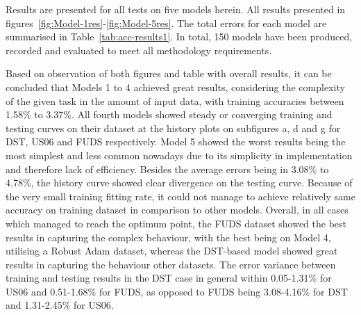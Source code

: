 
Results are presented for all tests on five models herein.
All results presented in figures~\ref{fig:Model-1res}-\ref{fig:Model-5res}.
The total errors for each model are summarised in Table~\ref{tab:acc-results1}.
In total, 150 models have been produced, recorded and evaluated to meet all methodology requirements.

Based on observation of both figures and table with overall results, it can be concluded that Models 1 to 4 achieved great results, considering the complexity of the given task in the amount of input data, with training accuracies between 1.58\% to 3.37\%.
All fourth models showed steady or converging training and testing curves on their dataset at the history plots on subfigures a, d and g for DST, US06 and FUDS respectively.
Model 5 showed the worst results being the most simplest and less common nowadays due to its simplicity in implementation and therefore lack of efficiency.
Besides the average errors being in 3.08\% to 4.78\%, the history curve showed clear divergence on the testing curve. 
Because of the very small training fitting rate, it could not manage to achieve relatively same accuracy on training dataset in comparison to other models.
Overall, in all cases which managed to reach the optimum point, the FUDS dataset showed the best results in capturing the complex behaviour, with the best being on Model 4, utilising a Robust Adam dataset,
whereas the DST-based model showed great results in capturing the behaviour other datasets.
The error variance between training and testing results in the DST case in general within 0.05-1.31\% for US06 and 0.51-1.68\% for FUDS, as opposed to FUDS being 3.08-4.16\% for DST and 1.31-2.45\% for US06.

